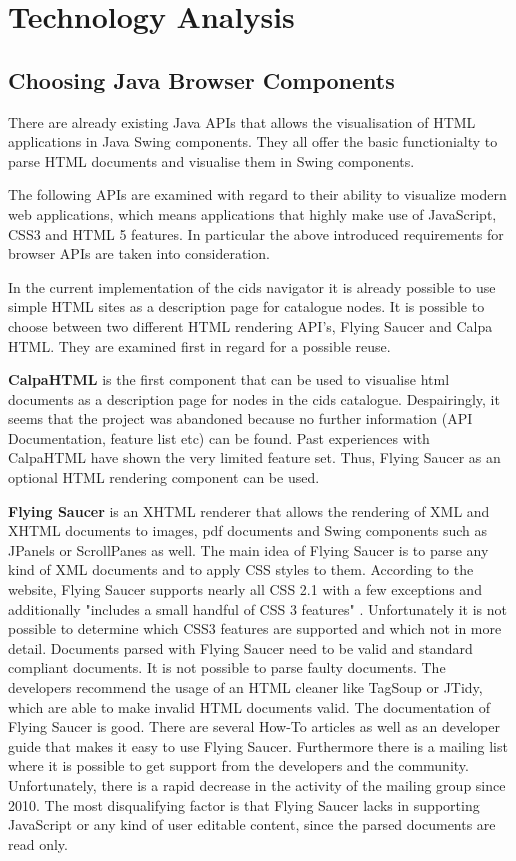 \chapter{Technology Analysis}\label{chap:tech_analysis}
	
\section{Choosing Java Browser Components}\label{chap:browser_api_comparison}
There are already existing Java APIs that allows the visualisation of HTML applications in Java Swing components.
They all offer the basic functionialty to parse HTML documents and visualise them in Swing components.

The following APIs are examined with regard to their ability to visualize modern web applications, which means applications that highly make use of JavaScript, CSS3 and HTML 5 features.
In particular the above introduced requirements for browser APIs are taken into consideration.

In the current implementation of the cids navigator it is already possible to use simple HTML sites as a description page for catalogue nodes.
It is possible to choose  between two different HTML rendering API's, Flying Saucer and Calpa HTML.
They are examined first in regard for a possible reuse.
 

\textbf{CalpaHTML} is the first component that can be used to visualise html documents as a description page for nodes in the cids catalogue.
Despairingly, it seems that the project was abandoned because no further information (API Documentation, feature list etc) can be found. 
Past experiences with CalpaHTML have shown the very limited feature set.
Thus, Flying Saucer as an optional HTML rendering component can be used.

\textbf{Flying Saucer} is an XHTML renderer that allows the rendering of XML and XHTML documents to images, pdf documents and Swing components such as JPanels or ScrollPanes as well.
The main idea of Flying Saucer is to parse any kind of XML documents and to apply CSS styles to them.
According to the website, Flying Saucer supports nearly all CSS 2.1 with a few exceptions and additionally "includes a small handful of CSS 3 features" \autocite{tech-ana:flying-saucer}.
Unfortunately it is not possible to determine which CSS3 features are supported and which not in more detail.
Documents parsed with Flying Saucer need to be valid and standard compliant documents.
It is not possible to parse faulty documents.
The developers recommend the usage of an HTML cleaner like TagSoup or JTidy, which are able to make invalid HTML documents valid.
The documentation of Flying Saucer is good.
There are several How-To articles as well as an developer guide that makes it easy to use Flying Saucer.
Furthermore there is a mailing list where it is possible to get support from the developers and the community.
Unfortunately, there is a rapid decrease in the activity of the mailing group since 2010.
The most disqualifying factor is that Flying Saucer lacks in supporting JavaScript or any kind of user editable content, since the parsed documents are read only.

